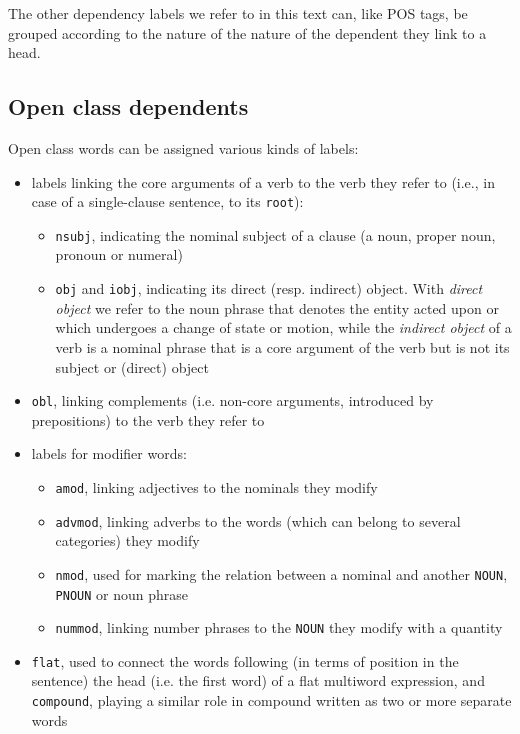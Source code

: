 The other dependency labels we refer to in this text can, like POS tags, be grouped according to the nature of the nature of the dependent they link to a head.

\subsection{Open class dependents}
Open class words can be assigned various kinds of labels: 
\begin{itemize}
    \item labels linking the core arguments of a verb to the verb they refer to (i.e., in case of a single-clause sentence, to its \texttt{root}): \begin{itemize}
        \item \texttt{nsubj}, indicating the nominal subject of a clause (a noun, proper noun, pronoun or numeral)
        \item \texttt{obj} and \texttt{iobj}, indicating its direct (resp. indirect) object. With \textit{direct object} we refer to the noun phrase that denotes the entity acted upon or which undergoes a change of state or motion, while the \textit{indirect object} of a verb is a nominal phrase that is a core argument of the verb but is not its subject or (direct) object 
    \end{itemize}
    \item \texttt{obl}, linking complements (i.e. non-core arguments, introduced by prepositions) to the verb they refer to
    \item labels for modifier words:    
    \begin{itemize}
        \item \texttt{amod}, linking adjectives to the nominals they modify
        \item \texttt{advmod}, linking adverbs to the words (which can belong to several categories) they modify
        \item \texttt{nmod}, used for marking the relation between a nominal and another \texttt{NOUN}, \texttt{PNOUN} or noun phrase
        \item \texttt{nummod}, linking number phrases to the \texttt{NOUN} they modify with a quantity
    \end{itemize}
    \item \texttt{flat}, used to connect the words following (in terms of position in the sentence) the head (i.e. the first word) of a flat multiword expression, and \texttt{compound}, playing a similar role in compound written as two or more separate words

\end{itemize}
